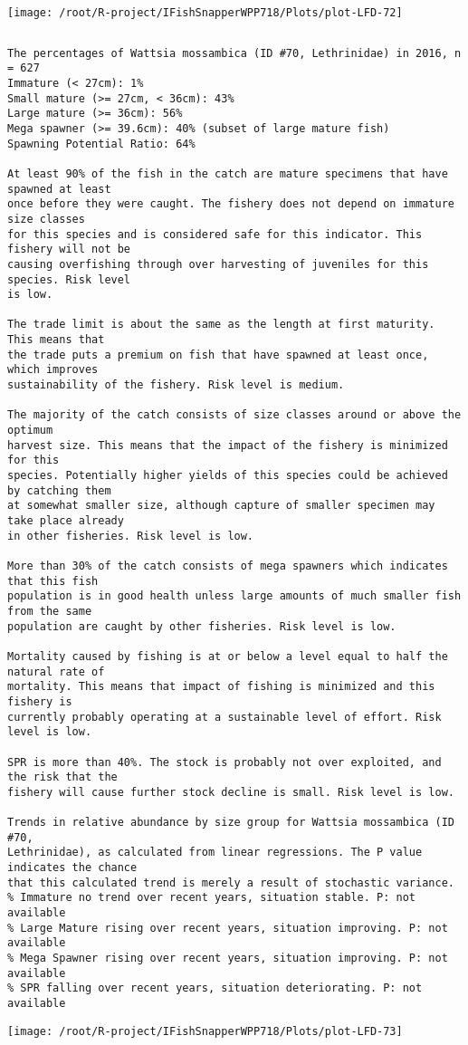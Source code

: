 \documentclass{report}\usepackage[]{graphicx}\usepackage[]{color}
\makeatletter
\def\maxwidth{ %
  \ifdim\Gin@nat@width>\linewidth
    \linewidth
  \else
    \Gin@nat@width
  \fi
}
\newenvironment{kframe}{%
 \def\at@end@of@kframe{}%
 \ifinner\ifhmode%
  \def\at@end@of@kframe{\end{minipage}}%
  \begin{minipage}{\columnwidth}%
 \fi\fi%
 \def\FrameCommand##1{\hskip\@totalleftmargin \hskip-\fboxsep
 \colorbox{shadecolor}{##1}\hskip-\fboxsep
     \hskip-\linewidth \hskip-\@totalleftmargin \hskip\columnwidth}%
 \MakeFramed {\advance\hsize-\width
   \@totalleftmargin\z@ \linewidth\hsize
   \@setminipage}}%
 {\par\unskip\endMakeFramed%
 \at@end@of@kframe}
\newenvironment{knitrout}{}{} %
\makeatother
\begin{document}
\begin{knitrout}
\texttt{[image: /root/R-project/IFishSnapperWPP718/Plots/plot-LFD-72]} 
\begin{kframe}\begin{verbatim}
\end{verbatim}
\end{kframe}
\clearpage
\newpage
\begin{kframe}\begin{verbatim}The percentages of Wattsia mossambica (ID #70, Lethrinidae) in 2016, n = 627
Immature (< 27cm): 1%
Small mature (>= 27cm, < 36cm): 43%
Large mature (>= 36cm): 56%
Mega spawner (>= 39.6cm): 40% (subset of large mature fish)
Spawning Potential Ratio: 64%
 
At least 90% of the fish in the catch are mature specimens that have spawned at least
once before they were caught. The fishery does not depend on immature size classes
for this species and is considered safe for this indicator. This fishery will not be
causing overfishing through over harvesting of juveniles for this species. Risk level
is low.

The trade limit is about the same as the length at first maturity.  This means that
the trade puts a premium on fish that have spawned at least once, which improves
sustainability of the fishery. Risk level is medium.

The majority of the catch consists of size classes around or above the optimum
harvest size. This means that the impact of the fishery is minimized for this
species. Potentially higher yields of this species could be achieved by catching them
at somewhat smaller size, although capture of smaller specimen may take place already
in other fisheries. Risk level is low.

More than 30% of the catch consists of mega spawners which indicates that this fish
population is in good health unless large amounts of much smaller fish from the same
population are caught by other fisheries. Risk level is low.
 
Mortality caused by fishing is at or below a level equal to half the natural rate of
mortality. This means that impact of fishing is minimized and this fishery is
currently probably operating at a sustainable level of effort. Risk level is low.
 
SPR is more than 40%. The stock is probably not over exploited, and the risk that the
fishery will cause further stock decline is small. Risk level is low.
 
Trends in relative abundance by size group for Wattsia mossambica (ID #70,
Lethrinidae), as calculated from linear regressions. The P value indicates the chance
that this calculated trend is merely a result of stochastic variance.
% Immature no trend over recent years, situation stable. P: not available
% Large Mature rising over recent years, situation improving. P: not available
% Mega Spawner rising over recent years, situation improving. P: not available
% SPR falling over recent years, situation deteriorating. P: not available
\end{verbatim}
\end{kframe}
\texttt{[image: /root/R-project/IFishSnapperWPP718/Plots/plot-LFD-73]} 


\end{knitrout}
\end{document}
